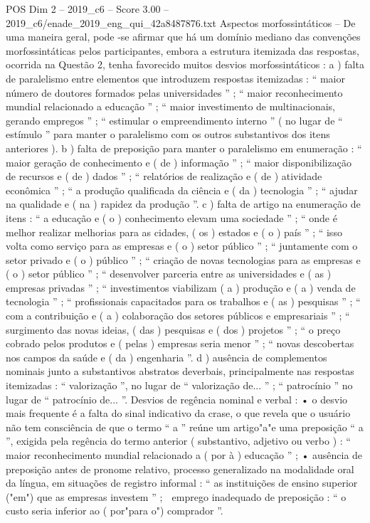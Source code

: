 \begin{textsample}{POS Dim 2 – 2019\_c6 – Score 3.00 – 2019\_c6/enade\_2019\_eng\_qui\_42a8487876.txt}
Aspectos morfossintáticos – De uma maneira geral, pode -se afirmar que há um domínio mediano das convenções morfossintáticas pelos participantes, embora a estrutura itemizada das respostas, ocorrida na Questão 2, tenha favorecido muitos desvios morfossintáticos : a ) falta de paralelismo entre elementos que introduzem respostas itemizadas : “ maior número de doutores formados pelas universidades ” ; “ maior reconhecimento mundial relacionado a educação ” ; “ maior investimento de multinacionais, gerando empregos ” ; “ estimular o empreendimento interno ” ( no lugar de “ estímulo ” para manter o paralelismo com os outros substantivos dos itens anteriores ). b ) falta de preposição para manter o paralelismo em enumeração : “ maior geração de conhecimento e ( de ) informação ” ; “ maior disponibilização de recursos e ( de ) dados ” ; “ relatórios de realização e ( de ) atividade econômica ” ; “ a produção qualificada da ciência e ( da ) tecnologia ” ; “ ajudar na qualidade e ( na ) rapidez da produção ”. c ) falta de artigo na enumeração de itens : “ a educação e ( o ) conhecimento elevam uma sociedade ” ; “ onde é melhor realizar melhorias para as cidades, ( os ) estados e ( o ) país ” ; “ isso volta como serviço para as empresas e ( o ) setor público ” ; “ juntamente com o setor privado e ( o ) público ” ; “ criação de novas tecnologias para as empresas e ( o ) setor público ” ; “ desenvolver parceria entre as universidades e ( as ) empresas privadas ” ; “ investimentos viabilizam ( a ) produção e ( a ) venda de tecnologia ” ; “ profissionais capacitados para os trabalhos e ( as ) pesquisas ” ; “ com a contribuição e ( a ) colaboração dos setores públicos e empresariais ” ; “ surgimento das novas ideias, ( das ) pesquisas e ( dos ) projetos ” ; “ o preço cobrado pelos produtos e ( pelas ) empresas seria menor ” ; “ novas descobertas nos campos da saúde e ( da ) engenharia ”. d ) ausência de complementos nominais junto a substantivos abstratos deverbais, principalmente nas respostas itemizadas : “ valorização ”, no lugar de “ valorização de... ” ; “ patrocínio ” no lugar de “ patrocínio de... ”.
Desvios de regência nominal e verbal : • o desvio mais frequente é a falta do sinal indicativo da crase, o que revela que o usuário não tem consciência de que o termo “ a ” reúne um artigo"a"e uma preposição “ a ”, exigida pela regência do termo anterior ( substantivo, adjetivo ou verbo ) : “ maior reconhecimento mundial relacionado a ( por à ) educação ” ; • ausência de preposição antes de pronome relativo, processo generalizado na modalidade oral da língua, em situações de registro informal : “ as instituições de ensino superior ("em") que as empresas investem ” ;  emprego inadequado de preposição : “ o custo seria inferior ao ( por"para o") comprador ”.

\end{textsample}
